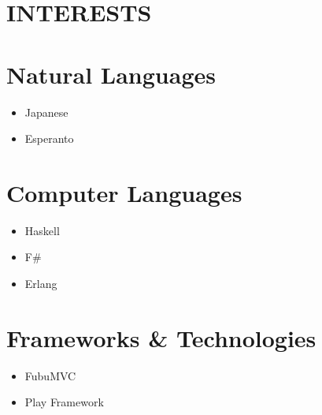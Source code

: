 \documentclass[margin]{res}
\begin{document}
\begin{resume}
\section {INTERESTS}
	\normalsize{\section{Natural Languages}}
		\begin{itemize}
			\item Japanese
			\item Esperanto
		\end{itemize}
	\normalsize{\section{Computer Languages}}
		\begin{itemize}
			\item Haskell
			\item F\#
			\item Erlang
		\end{itemize}
	\normalsize{\section{Frameworks \& Technologies}}
		\begin{itemize}
			\item FubuMVC
			\item Play Framework
		\end{itemize}



\end{resume} 
\end{document}

